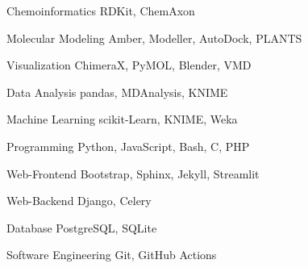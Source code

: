 \vspace{2.3mm}

\begin{cvskills}


    \cvskill
	{Chemoinformatics}
    {RDKit, ChemAxon}

    \cvskill
	{Molecular Modeling}
    {Amber, Modeller, AutoDock, PLANTS}

    \cvskill
	{Visualization}
    {ChimeraX, PyMOL, Blender, VMD}


    \cvskill
	{Data Analysis}
    {pandas, MDAnalysis, KNIME}

    \cvskill
	{Machine Learning}
    {scikit-Learn, KNIME, Weka}


	\cvskill
	{Programming}
    {Python, JavaScript, Bash, C, PHP}

	\cvskill
    {Web-Frontend}
    {Bootstrap, Sphinx, Jekyll, Streamlit}

    \cvskill
    {Web-Backend}
    {Django, Celery}

	\cvskill
    {Database}
    {PostgreSQL, SQLite}

	\cvskill
    {Software Engineering}
    {Git, GitHub Actions}

\end{cvskills}
